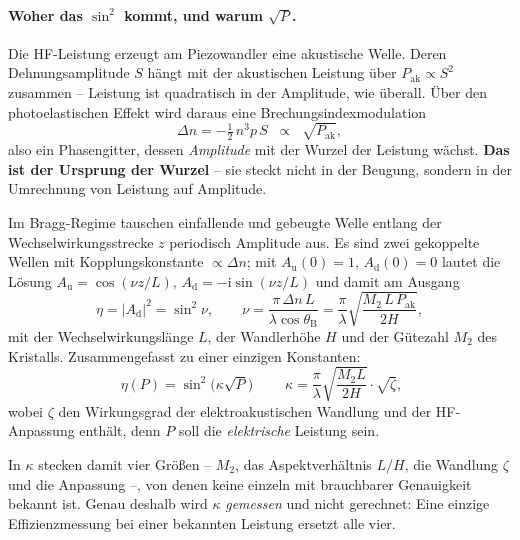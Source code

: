 \documentclass[11pt,a4paper]{article}
\begin{document}
\paragraph{Woher das \boldmath$\sin^2$ kommt, und warum \boldmath$\sqrt{P}$.}
Die HF-Leistung erzeugt am Piezowandler eine akustische Welle. Deren
Dehnungsamplitude $S$ hängt mit der akustischen Leistung über
$P_\mathrm{ak}\propto S^2$ zusammen -- Leistung ist quadratisch in der
Amplitude, wie überall. Über den photoelastischen Effekt wird daraus eine
Brechungsindexmodulation
\begin{equation}
  \Delta n = -\tfrac{1}{2}\,n^3 p\,S \;\;\propto\;\; \sqrt{P_\mathrm{ak}} ,
  \label{eq:photoelast}
\end{equation}
also ein Phasengitter, dessen \emph{Amplitude} mit der Wurzel der Leistung
wächst. \textbf{Das ist der Ursprung der Wurzel} -- sie steckt nicht in der
Beugung, sondern in der Umrechnung von Leistung auf Amplitude.

Im Bragg-Regime tauschen einfallende und gebeugte Welle entlang der
Wechselwirkungsstrecke $z$ periodisch Amplitude aus. Es sind zwei gekoppelte
Wellen mit Kopplungskonstante $\propto\Delta n$; mit $A_\mathrm{u}(0)=1$, $A_\mathrm{d}(0)=0$
lautet die Lösung $A_\mathrm{u}=\cos(\nu z/L)$, $A_\mathrm{d}=-\mathrm{i}\sin(\nu z/L)$ und
damit am Ausgang
\begin{equation}
  \eta = |A_\mathrm{d}|^2 = \sin^2\nu , \qquad
  \nu = \frac{\pi\,\Delta n\,L}{\lambda\cos\theta_\mathrm{B}}
      = \frac{\pi}{\lambda}\sqrt{\frac{M_2\,L\,P_\mathrm{ak}}{2H}} ,
\end{equation}
mit der Wechselwirkungslänge $L$, der Wandlerhöhe $H$ und der Gütezahl $M_2$
des Kristalls. Zusammengefasst zu einer einzigen Konstanten:
\begin{equation}
  \boxed{\;\eta(P) = \sin^2\!\bigl(\kappa\sqrt{P}\bigr)\;}
  \qquad
  \kappa = \frac{\pi}{\lambda}\sqrt{\frac{M_2 L}{2H}}\cdot\sqrt{\zeta} ,
  \label{eq:etasingle}
\end{equation}
wobei $\zeta$ den Wirkungsgrad der elektroakustischen Wandlung und der
HF-Anpassung enthält, denn $P$ soll die \emph{elektrische} Leistung sein.

\medskip
\noindent In $\kappa$ stecken damit vier Größen -- $M_2$, das
Aspektverhältnis $L/H$, die Wandlung $\zeta$ und die Anpassung --, von denen
keine einzeln mit brauchbarer Genauigkeit bekannt ist. Genau deshalb wird
$\kappa$ \emph{gemessen} und nicht gerechnet: Eine einzige Effizienzmessung
bei einer bekannten Leistung ersetzt alle vier.
\end{document}
